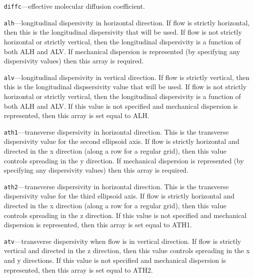 \begin{description}
\item \texttt{diffc}---effective molecular diffusion coefficient.

\item \texttt{alh}---longitudinal dispersivity in horizontal direction.  If flow is strictly horizontal, then this is the longitudinal dispersivity that will be used.  If flow is not strictly horizontal or strictly vertical, then the longitudinal dispersivity is a function of both ALH and ALV.  If mechanical dispersion is represented (by specifying any dispersivity values) then this array is required.

\item \texttt{alv}---longitudinal dispersivity in vertical direction.  If flow is strictly vertical, then this is the longitudinal dispsersivity value that will be used.  If flow is not strictly horizontal or strictly vertical, then the longitudinal dispersivity is a function of both ALH and ALV.  If this value is not specified and mechanical dispersion is represented, then this array is set equal to ALH.

\item \texttt{ath1}---transverse dispersivity in horizontal direction.  This is the transverse dispersivity value for the second ellipsoid axis.  If flow is strictly horizontal and directed in the x direction (along a row for a regular grid), then this value controls spreading in the y direction.  If mechanical dispersion is represented (by specifying any dispersivity values) then this array is required.

\item \texttt{ath2}---transverse dispersivity in horizontal direction.  This is the transverse dispersivity value for the third ellipsoid axis.  If flow is strictly horizontal and directed in the x direction (along a row for a regular grid), then this value controls spreading in the z direction.  If this value is not specified and mechanical dispersion is represented, then this array is set equal to ATH1.

\item \texttt{atv}---transverse dispersivity when flow is in vertical direction.  If flow is strictly vertical and directed in the z direction, then this value controls spreading in the x and y directions.  If this value is not specified and mechanical dispersion is represented, then this array is set equal to ATH2.

\end{description}

